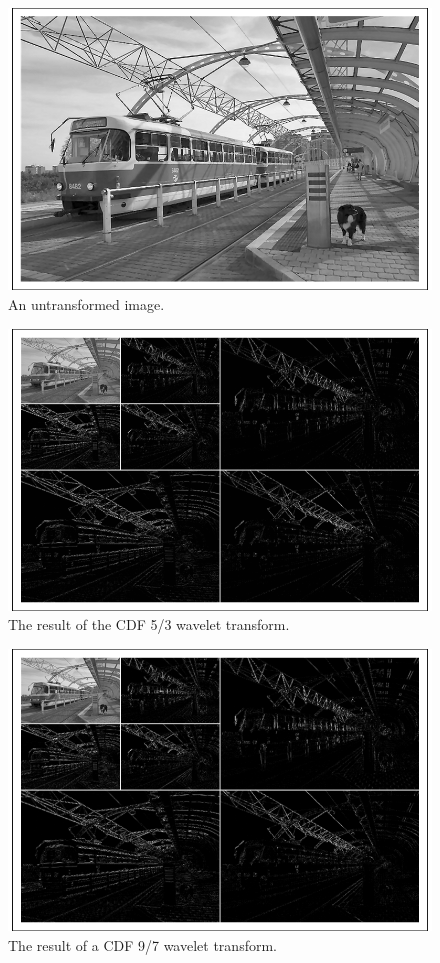 \documentclass[titlepage,12pt]{article}
\begin{document}
\begin{figure}[p]
	\centering
	\includegraphics[scale=0.35]{resources/example/originalExample.png}
	\caption{An untransformed image.}
	\label{fig:originalExample}
\end{figure}
\begin{figure}
    \centering
    \includegraphics[scale=0.35]{resources/example/losslessTransform.png}
    \caption{The result of the CDF 5/3 wavelet transform.}
    \label{fig:losslessTransform}
\end{figure}
\begin{figure}
    \centering
    \includegraphics[scale=0.35]{resources/example/lossyTransform.png}
    \caption{The result of a CDF 9/7 wavelet transform.}
    \label{fig:lossyTransform}
\end{figure}
\end{document}
